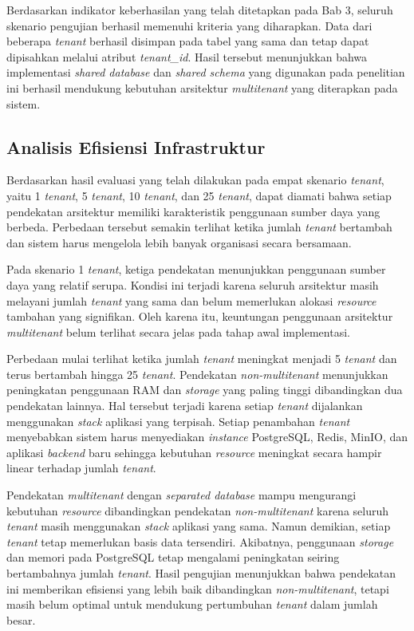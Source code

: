 Berdasarkan indikator keberhasilan yang telah ditetapkan pada Bab 3, seluruh skenario pengujian berhasil memenuhi kriteria yang diharapkan. Data dari beberapa \textit{tenant} berhasil disimpan pada tabel yang sama dan tetap dapat dipisahkan melalui atribut \textit{tenant\_id}. Hasil tersebut menunjukkan bahwa implementasi \textit{shared database} dan \textit{shared schema} yang digunakan pada penelitian ini berhasil mendukung kebutuhan arsitektur \textit{multitenant} yang diterapkan pada sistem.

\subsection{Analisis Efisiensi Infrastruktur}

Berdasarkan hasil evaluasi yang telah dilakukan pada empat skenario \textit{tenant}, yaitu 1 \textit{tenant}, 5 \textit{tenant}, 10 \textit{tenant}, dan 25 \textit{tenant}, dapat diamati bahwa setiap pendekatan arsitektur memiliki karakteristik penggunaan sumber daya yang berbeda. Perbedaan tersebut semakin terlihat ketika jumlah \textit{tenant} bertambah dan sistem harus mengelola lebih banyak organisasi secara bersamaan.

Pada skenario 1 \textit{tenant}, ketiga pendekatan menunjukkan penggunaan sumber daya yang relatif serupa. Kondisi ini terjadi karena seluruh arsitektur masih melayani jumlah \textit{tenant} yang sama dan belum memerlukan alokasi \textit{resource} tambahan yang signifikan. Oleh karena itu, keuntungan penggunaan arsitektur \textit{multitenant} belum terlihat secara jelas pada tahap awal implementasi.

Perbedaan mulai terlihat ketika jumlah \textit{tenant} meningkat menjadi 5 \textit{tenant} dan terus bertambah hingga 25 \textit{tenant}. Pendekatan \textit{non-multitenant} menunjukkan peningkatan penggunaan RAM dan \textit{storage} yang paling tinggi dibandingkan dua pendekatan lainnya. Hal tersebut terjadi karena setiap \textit{tenant} dijalankan menggunakan \textit{stack} aplikasi yang terpisah. Setiap penambahan \textit{tenant} menyebabkan sistem harus menyediakan \textit{instance} PostgreSQL, Redis, MinIO, dan aplikasi \textit{backend} baru sehingga kebutuhan \textit{resource} meningkat secara hampir linear terhadap jumlah \textit{tenant}.

Pendekatan \textit{multitenant} dengan \textit{separated database} mampu mengurangi kebutuhan \textit{resource} dibandingkan pendekatan \textit{non-multitenant} karena seluruh \textit{tenant} masih menggunakan \textit{stack} aplikasi yang sama. Namun demikian, setiap \textit{tenant} tetap memerlukan basis data tersendiri. Akibatnya, penggunaan \textit{storage} dan memori pada PostgreSQL tetap mengalami peningkatan seiring bertambahnya jumlah \textit{tenant}. Hasil pengujian menunjukkan bahwa pendekatan ini memberikan efisiensi yang lebih baik dibandingkan \textit{non-multitenant}, tetapi masih belum optimal untuk mendukung pertumbuhan \textit{tenant} dalam jumlah besar.

